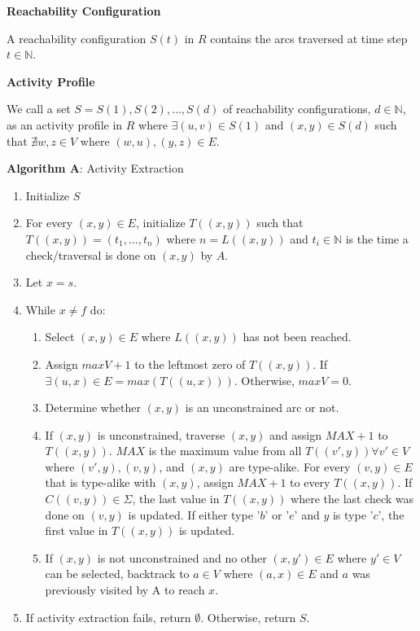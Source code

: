 \documentclass[12pt]{article}
\begin{document}
    \begin{definition} \textbf{Reachability Configuration} \cite{malinao-rdlt}

    A reachability configuration $S(t)$ in $R$ contains the arcs traversed at time step $t \in \mathbb{N}$.

    \end{definition}

    \begin{definition} \textbf{Activity Profile} \cite{malinao-rdlt}

    We call a set $S = S(1), S(2), \ldots, S(d)$ of reachability configurations, $d \in \mathbb{N}$, as an activity profile in $R$ where $\exists(u,v) \in S(1)$ and $(x,y) \in S(d)$ such that $ \nexists w,z \in V$ where $(w,u),(y,z) \in E$.

    \end{definition}

    \textbf{Algorithm A}: Activity Extraction \cite{malinao-rdlt}
    \begin{enumerate}
        \item Initialize $S$
        \item For every $(x,y) \in E$, initialize $T((x,y))$ such that $T((x,y)) = (t_{1},\ldots,t_{n})$ where $n = L((x,y))$ and $t_{i} \in \mathbb{N}$ is the time a check/traversal is done on $(x,y)$ by $A$.
        \item Let $x = s$.
        \item While $x \neq f$ do:
        \begin{enumerate}
            \item Select $(x,y) \in E$ where $L((x,y))$ has not been reached.
            \item Assign $maxV + 1$ to the leftmost zero of $T((x,y))$. If $\exists(u,x) \in E = max(T((u,x)))$. Otherwise, $maxV = 0$.
            \item Determine whether $(x,y)$ is an unconstrained arc or not.
            \item If $(x,y)$ is unconstrained, traverse $(x,y)$ and assign $MAX+1$ to $T((x,y))$. $MAX$ is the maximum value from all $T((v',y)) \forall v' \in V$ where $(v',y),(v,y)$, and $(x,y)$ are type-alike. For every $(v,y) \in E$ that is type-alike with $(x,y)$, assign $MAX+1$ to every $T((x,y))$. If $C((v,y)) \in \Sigma$, the last value in $T((x,y))$ where the last check was done on $(v,y)$ is updated. If either type '$b$' or '$e$' and $y$ is type '$c$', the first value in $T((x,y))$ is updated.
            \item If $(x,y)$ is not unconstrained and no other $(x,y') \in E$ where $y' \in V$ can be selected, backtrack to $a \in V$ where $(a,x) \in E$ and $a$ was previously visited by A to reach $x$.
        \end{enumerate}
        \item If activity extraction fails, return $\emptyset$. Otherwise, return $S$.
    \end{enumerate}
\end{document}
